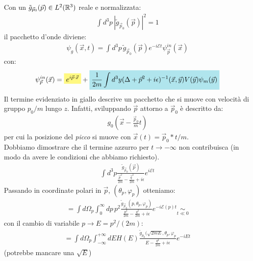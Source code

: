 \documentclass[../../FisicaTeorica.tex]{subfiles}
\begin{document}
Con un $\tilde{g}_{\vec{p}_0}(\vec{p}) \in L^2(\mathbb{R}^3)$ reale e normalizzata:
\begin{align*}
\int d^3 p\, |\tilde{g}_{\vec{p}_0}(\vec{p})|^2 = 1
\end{align*}
il pacchetto d'onde diviene:
\begin{align*}
\psi_g(\vec{x},t) = \int d^3 p\, \tilde{g}_{\vec{p}_0}(\vec{p}) e^{-i\mathcal{E}t} \psi_{\vec{p}}^{in}(\vec{x})
\end{align*}
con:
\begin{align*}
\psi_{\vec{p}}^{in}(\vec{x})= \hlc{Yellow}{e^{i\vec{p}\cdot \vec{x}}} + \hlc{SkyBlue}{\frac{1}{2m}\int d^3 y (\Delta + \vec{p}^2 + i\epsilon)^{-1} (\vec{x}, \vec{y}) V(\vec{y}) \psi_m (\vec{y})}
\end{align*}
Il termine evidenziato in giallo descrive un pacchetto che si muove con velocità di gruppo $p_0/m$ lungo $z$. Infatti, sviluppando $\vec{p}$ attorno a $\vec{p}_0$ è descritto da:
\begin{align*}
g_0 \left(\vec{x}-\frac{\vec{p}_0}{m}t\right)
\end{align*}
per cui la posizione del \textit{picco} si muove con $\vec{x}(t) = \vec{p}_0*t/m$.\\

Dobbiamo dimostrare che il termine azzurro per $t\to-\infty$ non contribuisca (in modo da avere le condizioni che abbiamo richiesto).\\
\begin{align*}
\int d^3 p \frac{\tilde{g}_{\vec{p}_0}(\vec{p})}{\displaystyle
\frac{\vec{p}^2}{2m} - \frac{\vec{q}^2}{2m} + i\epsilon} e^{i\mathcal{E}t}
\end{align*}
Passando in coordinate polari in $\vec{p}$, $(\theta_p, \varphi_p)$ otteniamo:
\begin{align*}
= \int d\Omega_p \int_0^\infty dp\, p^2 \frac{\tilde{g}_{\vec{p}_0}(p, \theta_p, \varphi_p)}{\frac{p^2}{2m}-\frac{q^2}{2m}+i\epsilon} e^{-i\mathcal{E}(p) t} \underset{t \ll 0}{\sim}
\end{align*}
con il cambio di variabile $p\to E=p^2/(2m)$:
\begin{align*}
=\int d\Omega_p \int_{-\infty}^{+\infty} dE H(E) 
\frac{\tilde{g}_{p_0}(\sqrt{2mE}, \theta_p, \varphi_p}{E-\frac{q^2}{2m}+ i\epsilon} e^{-iEt}
\end{align*}
(potrebbe mancare una $\sqrt{E}$)\\
\end{document}
